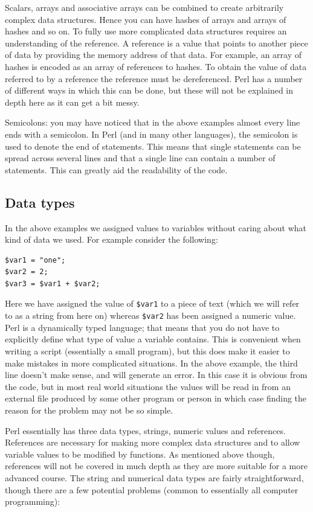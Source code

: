 \documentclass[11pt]{article}
\begin{document}
Scalars, arrays and associative arrays can be combined to create
arbitrarily complex data structures. Hence you can have hashes of arrays
and arrays of hashes and so on. To fully use more complicated data
structures requires an understanding of the reference. A reference is a
value that points to another piece of data by providing the memory
address of that data. For example, an array of hashes is encoded as an
array of references to hashes. To obtain the value of data referred to
by a reference the reference must be dereferenced. Perl has
a number of different ways in which this can be done, but these will not
be explained in depth here as it can get a bit messy. 

Semicolons: you may have noticed that in the above examples almost every
line ends with a semicolon. In Perl (and in many other languages), the
semicolon is used to denote the end of statements. This means
that single statements can be spread across several lines and that a
single line can contain a number of statements. This can greatly aid the
readability of the code.
\subsection{Data types}
\label{sec-5-3}


In the above examples we assigned values to variables without caring
about what kind of data we used. For example consider the following:


\begin{verbatim}
$var1 = "one";
$var2 = 2;
$var3 = $var1 + $var2;
\end{verbatim}

Here we have assigned the value of \texttt{\$var1} to a piece of text (which we
will refer to as a string from here on) whereas \texttt{\$var2} has been
assigned a numeric value. Perl is a dynamically typed language; that
means that you do not have to explicitly define what type of value a
variable contains. This is convenient when writing a script (essentially
a small program), but this does make it easier to make mistakes in more
complicated situations. In the above example, the third line doesn't
make sense, and will generate an error. In this case it is obvious from
the code, but in most real world situations the values will be read in
from an external file produced by some other program or person in which
case finding the reason for the problem may not be so simple.

Perl essentially has three data types, strings, numeric values and
references. References are necessary for making more complex data
structures and to allow variable values to be modified by functions. As
mentioned above though, references will not be covered in much depth as
they are more suitable for a more advanced course. The string and
numerical data types are fairly straightforward, though there are a few
potential problems (common to essentially all computer programming):
\end{document}
